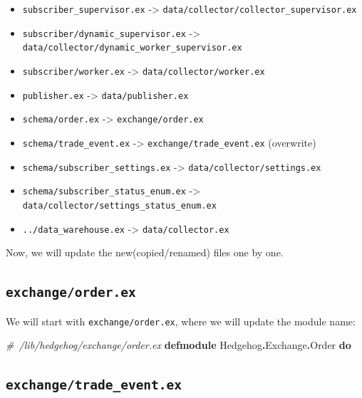 \documentclass[
  oneside]{book}
\newenvironment{Shaded}{\begin{snugshade}}{\end{snugshade}}
\newcommand{\CommentTok}[1]{\textcolor[rgb]{0.56,0.35,0.01}{\textit{#1}}}
\newcommand{\ConstantTok}[1]{\textcolor[rgb]{0.56,0.35,0.01}{#1}}
\newcommand{\KeywordTok}[1]{\textcolor[rgb]{0.13,0.29,0.53}{\textbf{#1}}}
\newcommand{\OperatorTok}[1]{\textcolor[rgb]{0.81,0.36,0.00}{\textbf{#1}}}
\providecommand{\tightlist}{%
  \setlength{\itemsep}{0pt}\setlength{\parskip}{0pt}}
\begin{document}
\begin{itemize}
\tightlist
\item
  \texttt{subscriber\_supervisor.ex} -\textgreater{} \texttt{data/collector/collector\_supervisor.ex}
\item
  \texttt{subscriber/dynamic\_supervisor.ex} -\textgreater{} \texttt{data/collector/dynamic\_worker\_supervisor.ex}
\item
  \texttt{subscriber/worker.ex} -\textgreater{} \texttt{data/collector/worker.ex}
\item
  \texttt{publisher.ex} -\textgreater{} \texttt{data/publisher.ex}
\item
  \texttt{schema/order.ex} -\textgreater{} \texttt{exchange/order.ex}
\item
  \texttt{schema/trade\_event.ex} -\textgreater{} \texttt{exchange/trade\_event.ex} (overwrite)
\item
  \texttt{schema/subscriber\_settings.ex} -\textgreater{} \texttt{data/collector/settings.ex}
\item
  \texttt{schema/subscriber\_status\_enum.ex} -\textgreater{} \texttt{data/collector/settings\_status\_enum.ex}
\item
  \texttt{../data\_warehouse.ex} -\textgreater{} \texttt{data/collector.ex}
\end{itemize}

Now, we will update the new(copied/renamed) files one by one.

\subsection{\texorpdfstring{\texttt{exchange/order.ex}}{exchange/order.ex}}\label{exchangeorder.ex}

We will start with \texttt{exchange/order.ex}, where we will update the module name:

\begin{Shaded}
\begin{Highlighting}[]
\CommentTok{\# /lib/hedgehog/exchange/order.ex}
\KeywordTok{defmodule} \ConstantTok{Hedgehog}\OperatorTok{.}\ConstantTok{Exchange}\OperatorTok{.}\ConstantTok{Order} \KeywordTok{do}
\end{Highlighting}
\end{Shaded}

\subsection{\texorpdfstring{\texttt{exchange/trade\_event.ex}}{exchange/trade\_event.ex}}\label{exchangetrade_event.ex}
\end{document}
